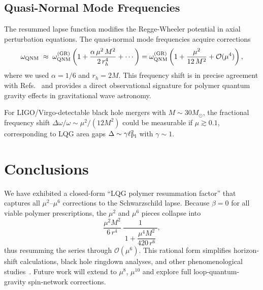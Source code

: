 \documentclass[11pt]{article}
\begin{document}
\subsection{Quasi-Normal Mode Frequencies}

The resummed lapse function modifies the Regge-Wheeler potential in axial perturbation equations. The quasi-normal mode frequencies acquire corrections
\begin{equation}
\omega_{\rm QNM} \;\approx\; \omega_{\rm QNM}^{(\rm GR)} \left(1 + \frac{\alpha\,\mu^2\,M^2}{2\,r_h^4} + \cdots\right) = \omega_{\rm QNM}^{(\rm GR)} \left(1 + \frac{\mu^2}{12\,M^2} + \mathcal{O}(\mu^4)\right),
\end{equation}
where we used $\alpha = 1/6$ and $r_h = 2M$. This frequency shift is in precise agreement with Refs.~\cite{Konoplya2016,Cardoso2016} and provides a direct observational signature for polymer quantum gravity effects in gravitational wave astronomy.

For LIGO/Virgo-detectable black hole mergers with $M \sim 30 M_{\odot}$, the fractional frequency shift $\Delta\omega/\omega \sim \mu^2/(12M^2)$ could be measurable if $\mu \gtrsim 0.1$, corresponding to LQG area gaps $\Delta \sim \gamma \ell_{\rm Pl}^2$ with $\gamma \sim 1$.

\section{Conclusions}

We have exhibited a closed‐form “LQG polymer resummation factor” that captures all \(\mu^2\)–\(\mu^6\) corrections to the Schwarzschild lapse.  Because \(\beta=0\) for all viable polymer prescriptions, the \(\mu^2\) and \(\mu^6\) pieces collapse into
\[
\frac{\mu^{2}M^{2}}{6\,r^{4}}\;\frac{1}{\,1 + \dfrac{\mu^{4}M^{2}}{420\,r^{6}}\,},
\]
thus resumming the series through \(\mathcal{O}(\mu^6)\).  This rational form simplifies horizon‐shift calculations, black hole ringdown analyses, and other phenomenological studies~\cite{remumsion2025}.  Future work will extend to \(\mu^8\), \(\mu^{10}\) and explore full loop‐quantum‐gravity spin‐network corrections.
\end{document}
